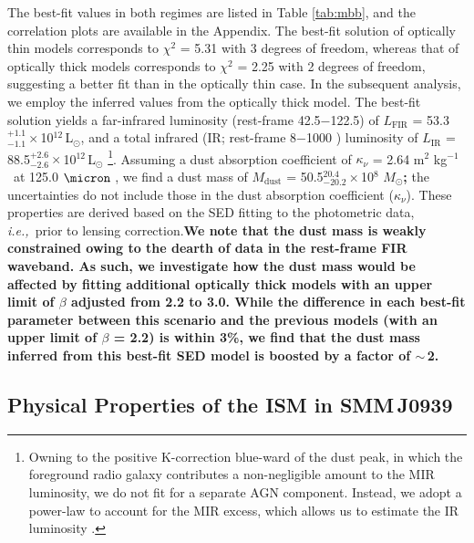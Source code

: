 \documentclass[iop, revtex4]{emulateapj}
\newcommand{\Msun}{\mbox{$M_{\odot}$}}
\newcommand{\Lsun}{\mbox{L$_{\odot}$}}
\newcommand{\eg}{{\sl e.g.,~}}
\newcommand{\ie}{{\sl i.e.,~}}
\newcommand{\pmOne}{\mbox{$^{-1}$}}
\begin{document}

The best-fit values in both regimes are listed in Table \ref{tab:mbb}, and the correlation plots are available in the Appendix. The best-fit solution of optically thin
models corresponds to $\chi^2$ = 5.31 with 3 degrees of freedom, whereas that of optically thick models
corresponds to $\chi^2$ = 2.25 with 2 degrees of freedom, suggesting a better fit than in the optically thin
case. In the subsequent analysis, we employ the inferred values from the optically thick model.
The best-fit solution yields a far-infrared luminosity (rest-frame 42.5$-$122.5\micron) of $L_\textrm{FIR}$ = 53.3$^{+1.1}_{-1.1}$\,$\times$\,10$^{12}$\,\Lsun, and a total infrared (IR; rest-frame 8$-$1000 \micron) luminosity of $L_\textrm{IR}$ = 88.5$^{+2.6}_{-2.6}$\,$\times$\,10$
^{12}$\,\Lsun
\footnote{
Owning to the positive K-correction blue-ward of the dust peak, in which 
the foreground radio galaxy contributes a non-negligible amount to the MIR luminosity, we do not fit for a separate AGN component.
Instead, we adopt a power-law to account for the MIR excess, which allows us to estimate the IR
luminosity \citep[\eg][]{Casey12a, Riechers13a, Kirkpatrick15a}. }. 
Assuming a dust absorption coefficient of $\kappa_{\nu}$ = 2.64\,\,m$^2$\,\,kg\pmOne\ at 125.0\,\,$
\micron$ \citep{Dunne03a}, we find a dust mass of $M_\textrm{dust}$ = 50.5$^{20.4}_{-20.2}\times$10$^8$\,\,\Msun{\bf ;} the uncertainties do not include those in the dust absorption coefficient ($\kappa_{\nu}$). These properties are derived based on the SED fitting to the photometric data, \ie prior
to lensing correction.{\bf We note that the dust mass is weakly constrained owing to the dearth of data in the {\bf rest-frame} FIR waveband. As such, we investigate how the dust mass would be affected by fitting additional optically thick models with an upper limit of 
 $\beta$ adjusted from 2.2 to 3.0. While the difference in each best-fit parameter between this scenario and the previous models (with an upper limit of $\beta$ = 2.2) is within 3\%, we find that the dust mass inferred from this best-fit SED model is boosted by a factor of $\sim$\,2.}
\subsection{Physical Properties of the ISM in SMM\,J0939}
\end{document}
